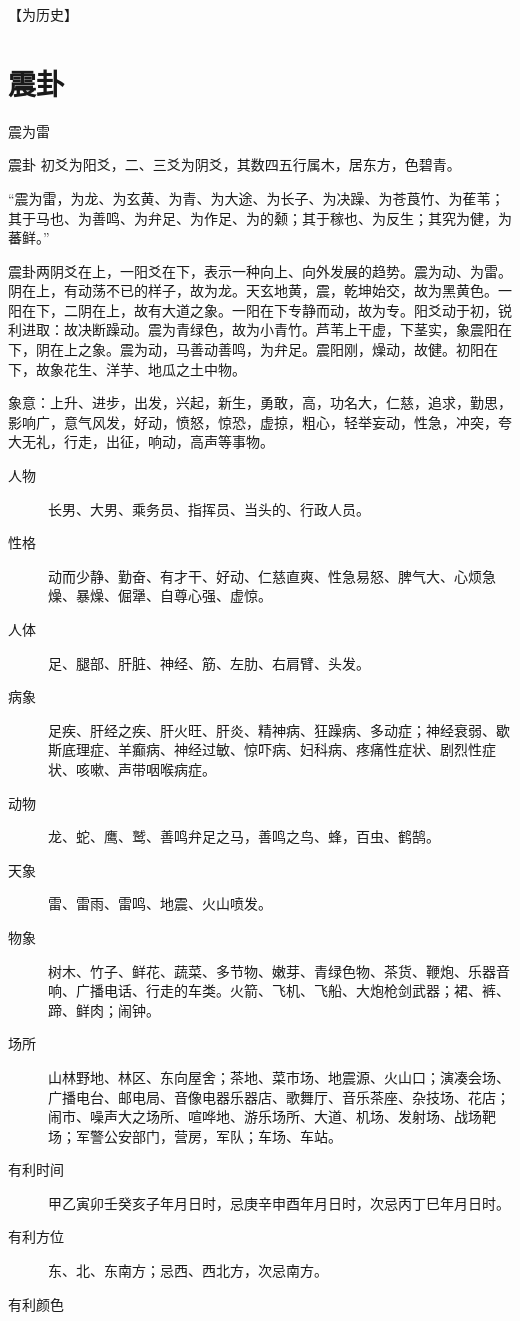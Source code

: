 \documentclass[12pt,oneside]{book}
\begin{document}
【为历史】


\section{震卦}
震为雷

震卦 初爻为阳爻，二、三爻为阴爻，其数四五行属木，居东方，色碧青。

“震为雷，为龙、为玄黄、为青、为大途、为长子、为决躁、为苍莨竹、为萑苇；其于马也、为善鸣、为弁足、为作足、为的颡；其于稼也、为反生；其究为健，为蕃鲜。”

震卦两阴爻在上，一阳爻在下，表示一种向上、向外发展的趋势。震为动、为雷。阴在上，有动荡不已的样子，故为龙。天玄地黄，震，乾坤始交，故为黑黄色。一阳在下，二阴在上，故有大道之象。一阳在下专静而动，故为专。阳爻动于初，锐利进取：故决断躁动。震为青绿色，故为小青竹。芦苇上干虚，下茎实，象震阳在下，阴在上之象。震为动，马善动善鸣，为弁足。震阳刚，燥动，故健。初阳在下，故象花生、洋芋、地瓜之土中物。


象意：上升、进步，出发，兴起，新生，勇敢，高，功名大，仁慈，追求，勤思，影响广，意气风发，好动，愤怒，惊恐，虚掠，粗心，轻举妄动，性急，冲突，夸大无礼，行走，出征，响动，高声等事物。

\begin{description}
\item[人物] 长男、大男、乘务员、指挥员、当头的、行政人员。
\item[性格] 动而少静、勤奋、有才干、好动、仁慈直爽、性急易怒、脾气大、心烦急燥、暴燥、倔犟、自尊心强、虚惊。
\item[人体] 足、腿部、肝脏、神经、筋、左肋、右肩臂、头发。
\item[病象] 足疾、肝经之疾、肝火旺、肝炎、精神病、狂躁病、多动症；神经衰弱、歇斯底理症、羊癫病、神经过敏、惊吓病、妇科病、疼痛性症状、剧烈性症状、咳嗽、声带咽喉病症。
\item[动物] 龙、蛇、鹰、鹫、善鸣弁足之马，善鸣之鸟、蜂，百虫、鹤鹄。
\item[天象] 雷、雷雨、雷鸣、地震、火山喷发。
\item[物象] 树木、竹子、鲜花、蔬菜、多节物、嫩芽、青绿色物、茶货、鞭炮、乐器音响、广播电话、行走的车类。火箭、飞机、飞船、大炮枪剑武器；裙、裤、蹄、鲜肉；闹钟。
\item[场所] 山林野地、林区、东向屋舍；茶地、菜市场、地震源、火山口；演凑会场、广播电台、邮电局、音像电器乐器店、歌舞厅、音乐茶座、杂技场、花店；闹市、噪声大之场所、喧哗地、游乐场所、大道、机场、发射场、战场靶场；军警公安部门，营房，军队；车场、车站。
\item[有利时间] 甲乙寅卯壬癸亥子年月日时，忌庚辛申酉年月日时，次忌丙丁巳年月日时。
\item[有利方位] 东、北、东南方；忌西、西北方，次忌南方。
\item[有利颜色] 
\end{description}
\end{document}
